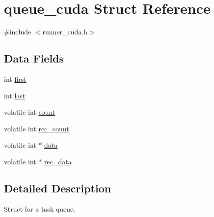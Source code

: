 \hypertarget{structqueue__cuda}{\section{queue\-\_\-cuda Struct Reference}
\label{structqueue__cuda}
}


{\ttfamily \#include $<$runner\-\_\-cuda.\-h$>$}

\subsection*{Data Fields}
\begin{DoxyCompactItemize}
\item 
int \hyperlink{structqueue__cuda_a6c8ec3c3e77241328358d43697f6f840}{first}
\item 
int \hyperlink{structqueue__cuda_a72e27dee31b1c4c6a504fbed29542d97}{last}
\item 
volatile int \hyperlink{structqueue__cuda_ab2caed1cbe66b4adb794da880e147fdc}{count}
\item 
volatile int \hyperlink{structqueue__cuda_aa2f0192d7cc598812ece12dc8acb1a4a}{rec\-\_\-count}
\item 
volatile int $\ast$ \hyperlink{structqueue__cuda_aa9110aa2633e6059a5929565aefaf3ec}{data}
\item 
volatile int $\ast$ \hyperlink{structqueue__cuda_a0d911ca38ccdae3becea0f18836a3c90}{rec\-\_\-data}
\end{DoxyCompactItemize}


\subsection{Detailed Description}
Struct for a task queue. 

